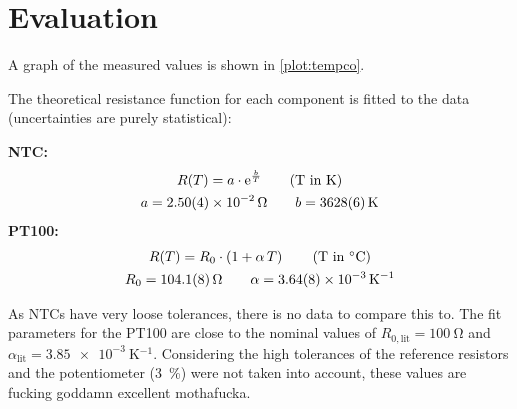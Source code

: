 \section{Evaluation}

A graph of the measured values is shown in \autoref{plot:tempco}.

The theoretical resistance function for each component is fitted to the data (uncertainties are purely statistical):

\textbf{NTC:}
\begin{gather*}
	R(T) = a \cdot \mathrm{e}^{\frac{b}{T}} \tag*{(T in \si{\kelvin})}\\
	a = \SI{2.50(4)e-2}{\ohm}	\qquad	b = \SI{3628(6)}{\kelvin}
\end{gather*}
\textbf{PT100:}
\begin{gather*}
	R(T) = R_0 \cdot \left(1 + \alpha \, T \right) \tag*{(T in \si{\celsius})}\\
	R_0 = \SI{104.1(8)}{\ohm}	\qquad	\alpha = \SI{3.64(8)e-3}{\kelvin^{-1}}
\end{gather*}

As NTCs have very loose tolerances, there is no data to compare this to.
The fit parameters for the PT100 are close to the nominal values of $R_{0,\text{lit}} = \SI{100}{\ohm}$ and $\alpha_\text{lit} = \SI{3.85e-3}{\kelvin^{-1}}$.
Considering the high tolerances of the reference resistors and the potentiometer (\SI{3}{\percent}) were not taken into account, these values are fucking goddamn excellent mothafucka. 

